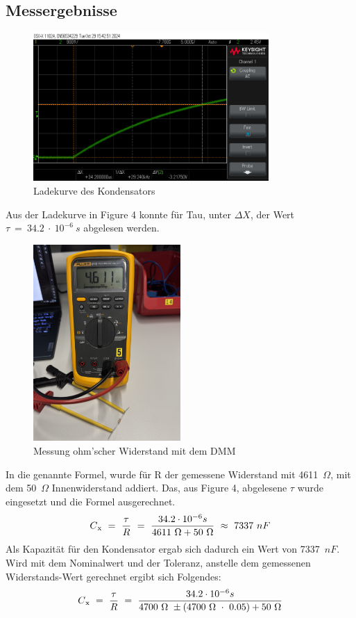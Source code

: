 \documentclass[a4paper,12pt]{article}
\begin{document}
\subsection{Messergebnisse}

\begin{figure}[H]
    \centering
    \includegraphics[width=0.8\textwidth]{../Quellen/Labor2/scope_1.png}
\caption{Ladekurve des Kondensators}
\end{figure}
Aus der Ladekurve in Figure 4 konnte für Tau, unter $\Delta X$, der Wert \(\tau~=~34.2~\cdot~10^{-6}~s\) abgelesen werden.\\

\begin{figure}[H]
    \centering
    \includegraphics[width=0.5\textwidth]{../Quellen/Labor2/Fotos/IMG_3963gezoomt.jpeg}
\caption{Messung ohm'scher Widerstand mit dem DMM}
\end{figure}

\noindent In die genannte Formel, wurde für R der gemessene Widerstand mit 4611~$\Omega$, mit dem 50~$\Omega$ Innenwiderstand addiert. Das, aus Figure 4, abgelesene $\tau$ wurde eingesetzt und die Formel ausgerechnet.
\[
C\textsubscript{x} ~=~ \frac{\tau}{R} ~=~ \frac{34.2 \cdot 10^{-6}s}{4611~\Omega + 50~\Omega} ~\approx~ 7337~nF
\]
\noindent Als Kapazität für den Kondensator ergab sich dadurch ein Wert von 7337~$nF$.\\
Wird mit dem Nominalwert und der Toleranz, anstelle dem gemessenen Widerstands-Wert gerechnet ergibt sich Folgendes:
\[
C\textsubscript{x} ~=~ \frac{\tau}{R} ~=~ \frac{34.2 \cdot 10^{-6}s}{4700~\Omega~\pm(4700~\Omega~\cdot~0.05) + 50~\Omega}
\]
\end{document}
